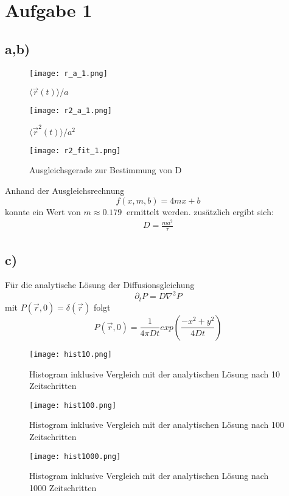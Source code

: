 \documentclass[paper=a4, ngerman]{scrartcl}
\begin{document}
\section{Aufgabe 1}
\subsection{a,b)}
\begin{figure}[htbp]
	\centering
	\texttt{[image: r\_a\_1.png]}
	\caption{$\langle \vec{r}(t)\rangle / a$}
	\label{fig:label}
\end{figure}
\begin{figure}[htbp]
	\centering
	\texttt{[image: r2\_a\_1.png]}
	\caption{$\langle \vec{r}^2(t)\rangle / a^2$}
	\label{fig:label}
\end{figure}
\begin{figure}[htbp]
	\centering
	\texttt{[image: r2\_fit\_1.png]}
	\caption{Ausgleichsgerade zur Bestimmung von D}
	\label{fig:label}
\end{figure}
Anhand der Ausgleichsrechnung 
\begin{equation}
	f(x,m,b) = 4mx+b
\end{equation} 
konnte ein Wert von $m \approx \SI{0.179}{}$ ermittelt werden.
zusätzlich ergibt sich:
\begin{align}
D = \frac{ma^2}{\tau}
\end{align}

\FloatBarrier
\subsection{c)}
Für die analytische Lösung der Diffusionsgleichung 
\begin{equation}
\partial_tP=D\nabla^2P
\end{equation}
mit $P(\vec{r},0)=\delta(\vec{r})$ folgt
\begin{equation}
	P(\vec{r},0) = \frac{1}{4\pi D t}exp(\frac{-x^2+y^2}{4Dt})
\end{equation}
\begin{figure}[htbp]
	\centering
	\texttt{[image: hist10.png]}
	\caption{Histogram inklusive Vergleich mit der analytischen Lösung nach 10 Zeitschritten}
	\label{fig:label}
\end{figure}
\begin{figure}[htbp]
	\centering
	\texttt{[image: hist100.png]}
	\caption{Histogram inklusive Vergleich mit der analytischen Lösung nach 100 Zeitschritten}
	\label{fig:label}
\end{figure}
\begin{figure}[htbp]
	\centering
	\texttt{[image: hist1000.png]}
	\caption{Histogram inklusive Vergleich mit der analytischen Lösung nach 1000 Zeitschritten}
	\label{fig:label}
\end{figure}
\end{document}
